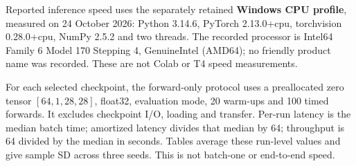 Reported inference speed uses the separately retained \textbf{Windows CPU profile},
measured on 24 October 2026: Python 3.14.6, PyTorch 2.13.0+cpu, torchvision
0.28.0+cpu, NumPy 2.5.2 and two threads. The recorded processor is Intel64
Family 6 Model 170 Stepping 4, GenuineIntel (AMD64); no friendly product name
was recorded. These are not Colab or T4 speed measurements.

For each selected checkpoint, the forward-only protocol uses a preallocated
zero tensor \([64,1,28,28]\), float32, evaluation mode, 20 warm-ups and 100 timed
forwards. It excludes checkpoint I/O, loading and transfer. Per-run latency is
the median batch time; amortized latency divides that median by 64; throughput
is 64 divided by the median in seconds. Tables average these run-level values
and give sample SD across three seeds. This is not batch-one or end-to-end speed.
\FloatBarrier
